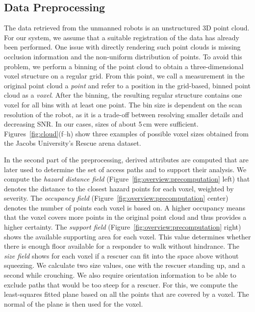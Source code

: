 \documentclass[conference,10pt,letter]{IEEEtran}
\begin{document}
\subsection{Data Preprocessing} \label{sec:overview:preprocessing}
The data retrieved from the unmanned robots is an unstructured 3D point cloud. For our system, we assume that a suitable registration of the data has already been performed. One issue with directly rendering such point clouds is missing occlusion information and the non-uniform distribution of points. To avoid this problem, we perform a binning of the point cloud to obtain a three-dimensional voxel structure on a regular grid. From this point, we call a measurement in the original point cloud a \emph{point} and refer to a position in the grid-based, binned point cloud as a \emph{voxel}. After the binning, the resulting regular structure contains one voxel for all bins with at least one point. The bin size is dependent on the scan resolution of the robot, as it is a trade-off between resolving smaller details and decreasing SNR. In our cases, sizes of about 5\,cm were sufficient. Figures~\ref{fig:cloud}(f--h) show three examples of possible voxel sizes obtained from the Jacobs University's Rescue arena dataset.

In the second part of the preprocessing, derived attributes are computed that are later used to determine the set of access paths and to support their analysis. We compute the \emph{hazard distance field} (Figure~\ref{fig:overview:precomputation} left) that denotes the distance to the closest hazard points for each voxel, weighted by severity. The \emph{occupancy field} (Figure~\ref{fig:overview:precomputation} center) denotes the number of points each voxel is based on. A higher occupancy means that the voxel covers more points in the original point cloud and thus provides a higher certainty. The \emph{support field} (Figure~\ref{fig:overview:precomputation} right) shows the available supporting area for each voxel. This value determines whether there is enough floor available for a responder to walk without hindrance. The \emph{size field} shows for each voxel if a rescuer can fit into the space above without squeezing. We calculate two size values, one with the rescuer standing up, and a second while crouching. We also require orientation information to be able to exclude paths that would be too steep for a rescuer. For this, we compute the least-squares fitted plane based on all the points that are covered by a voxel. The normal of the plane is then used for the voxel.
\end{document}
